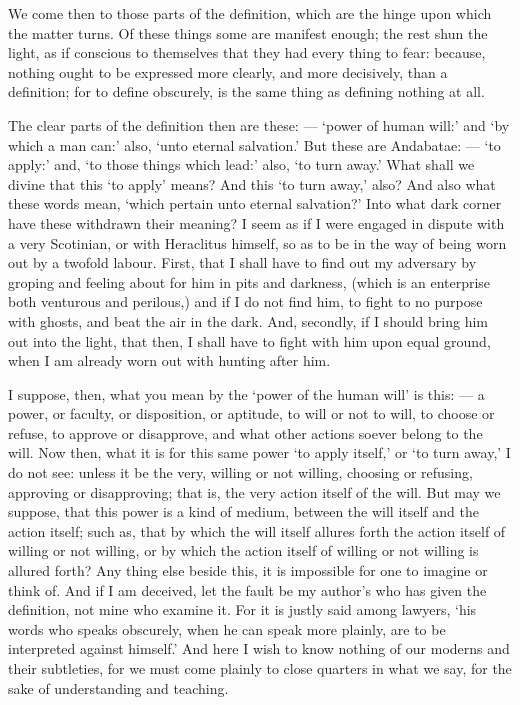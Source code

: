 We come then to those parts of the definition, which are the hinge upon which the matter turns. Of these things some are manifest enough; the rest shun the light, as if conscious to themselves that they had every thing to fear: because, nothing ought to be expressed more clearly, and more decisively, than a definition; for to define obscurely, is the same thing as defining nothing at all.

The clear parts of the definition then are these: — ‘power of human will:’ and ‘by which a man can:’ also, ‘unto eternal salvation.’ But these are Andabatae: — ‘to apply:’ and, ‘to those things which lead:’ also, ‘to turn away.’ What shall we divine that this ‘to apply’ means? And this ‘to turn away,’ also? And also what these words mean, ‘which pertain unto eternal salvation?’ Into what dark corner have these withdrawn their meaning? I seem as if I were engaged in dispute with a very Scotinian, or with Heraclitus himself, so as to be in the way of being worn out by a twofold labour. First, that I shall have to find out my adversary by groping and feeling about for him in pits and darkness, (which is an enterprise both venturous and perilous,) and if I do not find him, to fight to no purpose with ghosts, and beat the air in the dark. And, secondly, if I should bring him out into the light, that then, I shall have to fight with him upon equal ground, when I am already worn out with hunting after him.

I suppose, then, what you mean by the ‘power of the human will’ is this: — a power, or faculty, or disposition, or aptitude, to will or not to will, to choose or refuse, to approve or disapprove, and what other actions soever belong to the will. Now then, what it is for this same power ‘to apply itself,’ or ‘to turn away,’ I do not see: unless it be the very, willing or not willing, choosing or refusing, approving or disapproving; that is, the very action itself of the will. But may we suppose, that this power is a kind of medium, between the will itself and the action itself; such as, that by which the will itself allures forth the action itself of willing or not willing, or by which the action itself of willing or not willing is allured forth? Any thing else beside this, it is impossible for one to imagine or think of. And if I am deceived, let the fault be my author’s who has given the definition, not mine who examine it. For it is justly said among lawyers, ‘his words who speaks obscurely, when he can speak more plainly, are to be interpreted against himself.’ And here I wish to know nothing of our moderns and their subtleties, for we must come plainly to close quarters in what we say, for the sake of understanding and teaching.

